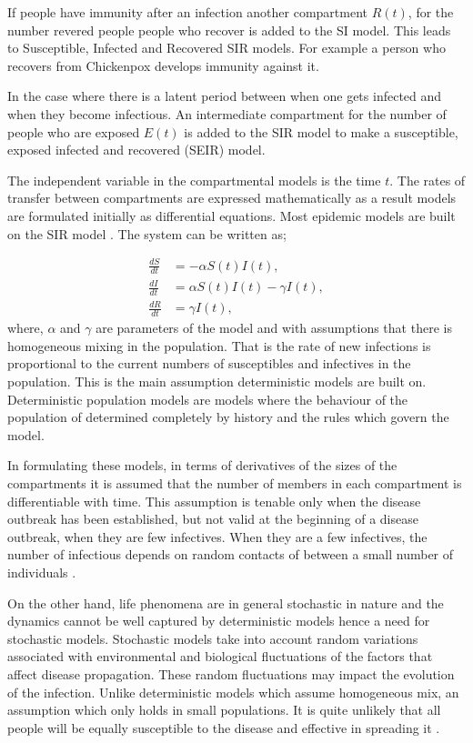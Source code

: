 If people have immunity after an infection another compartment $R(t)$, for the number revered people people who recover is added to the SI model. This leads to Susceptible, Infected and Recovered SIR models. For example a person who recovers from Chickenpox develops immunity against it. 

In the case where there is a latent period between when one gets infected and when they become infectious. An intermediate compartment for the number of people who are exposed $E(t)$ is added to the SIR model to make a susceptible, exposed infected and recovered (SEIR) model. 

The independent variable in the compartmental models is the time $t$. The rates of transfer between compartments are expressed mathematically as a result models are formulated initially as differential equations. Most epidemic models are built on the SIR model \citep{m1925applications}. The system can be written as;

\begin{align}\label{eqn1_1}
\frac{dS}{dt} &= -\alpha S(t) I(t), \nonumber  \\
\frac{dI}{dt} &= \alpha S(t) I(t) - \gamma  I(t), \\
\frac{dR}{dt} &= \gamma  I(t), \nonumber  
\end{align}
where, $\alpha$ and $\gamma$ are parameters of the model and with assumptions that there is homogeneous mixing in the population. That is the rate of new infections is proportional to the current numbers of susceptibles and infectives in the population. This is the main assumption deterministic models are built on. Deterministic population  models are models where the behaviour of the population of determined completely by history and the rules which govern the model. 

In formulating these models, in terms of derivatives of the sizes of the compartments it is assumed that the number of members in each compartment is differentiable with time. This assumption is tenable only when the disease outbreak has been established, but not valid at the beginning of a disease outbreak, when they are few infectives. When they are a few infectives, the number of infectious depends on random contacts of between a small number of individuals \citep{brauer2012mathematical}.
 
On the other hand, life phenomena are in general stochastic in nature and the dynamics cannot be well captured by deterministic models hence a need
for stochastic models. Stochastic models take into account random variations associated with environmental and biological fluctuations of the factors that affect disease propagation. These random fluctuations may impact the evolution of the infection. Unlike deterministic models which assume homogeneous mix, an assumption which only holds in small populations. It is quite unlikely that all people will be equally susceptible to the disease and effective in spreading it \citep{ball1985deterministic}.


